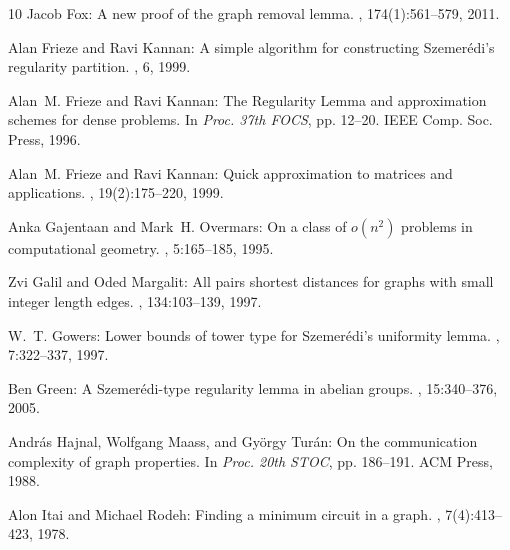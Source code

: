 \begin{thebibliography}{10}
{\sc Jacob Fox}: A new proof of the graph removal lemma.
, 174(1):561--579, 2011.

{\sc Alan Frieze and Ravi Kannan}: A simple algorithm for constructing
  {S}zemer{\'e}di's regularity partition.
, 6, 1999.

{\sc Alan~M. Frieze and Ravi Kannan}: The {R}egularity {L}emma and
  approximation schemes for dense problems.
\newblock In {\em Proc. 37th FOCS}, pp. 12--20. IEEE Comp. Soc. Press, 1996.

{\sc Alan~M. Frieze and Ravi Kannan}: Quick approximation to matrices and
  applications.
, 19(2):175--220, 1999.
\newblock [\epfmtdoi{10.1007/s004930050052}]

{\sc Anka Gajentaan and Mark~H. Overmars}: On a class of $o(n^2)$ problems in
  computational geometry.
, 5:165--185, 1995.
\newblock [\epfmtdoi{10.1016/0925-7721(95)00022-2}]

{\sc Zvi Galil and Oded Margalit}: All pairs shortest distances for graphs with
  small integer length edges.
, 134:103--139, 1997.

{\sc W.~T. Gowers}: Lower bounds of tower type for {S}zemer\'{e}di's uniformity
  lemma.
, 7:322--337, 1997.
\newblock [\epfmtdoi{10.1007/PL00001621}]

{\sc Ben Green}: A {S}zemer{\'e}di-type regularity lemma in abelian groups.
, 15:340--376, 2005.
\newblock [\epfmtdoi{10.1007/s00039-005-0509-8}]

{\sc Andr{\'a}s Hajnal, Wolfgang Maass, and Gy{\"o}rgy Tur{\'a}n}: On the
  communication complexity of graph properties.
\newblock In {\em Proc. 20th STOC}, pp. 186--191. ACM Press, 1988.
\newblock [\epfmtdoi{10.1145/62212.62228}]

{\sc Alon Itai and Michael Rodeh}: Finding a minimum circuit in a graph.
, 7(4):413--423, 1978.
\newblock [\epfmtdoi{10.1137/0207033}]


\end{thebibliography}
